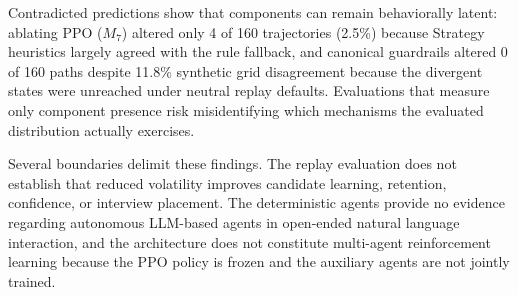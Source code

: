 Contradicted predictions show that components can remain behaviorally latent: ablating PPO ($M_7$) altered only 4 of 160 trajectories (2.5\%) because Strategy heuristics largely agreed with the rule fallback, and canonical guardrails altered 0 of 160 paths despite 11.8\% synthetic grid disagreement because the divergent states were unreached under neutral replay defaults. Evaluations that measure only component presence risk misidentifying which mechanisms the evaluated distribution actually exercises.

Several boundaries delimit these findings. The replay evaluation does not establish that reduced volatility improves candidate learning, retention, confidence, or interview placement. The deterministic agents provide no evidence regarding autonomous LLM-based agents in open-ended natural language interaction, and the architecture does not constitute multi-agent reinforcement learning because the PPO policy is frozen and the auxiliary agents are not jointly trained.
